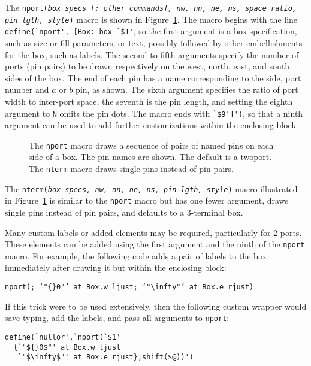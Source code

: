 The {\tt nport({\sl box specs {\tt[;} other commands{\tt]},
  nw, nn, ne, ns, space ratio, pin lgth, style})}
macro is shown in Figure~\ref{Nport}.
The macro begins with the line \verb|define(`nport',`[Box: box `$1'|,
so the first argument is a box specification, such as size or fill parameters,
or text, possibly followed by other embellishments for the box, such as labels.
The second to fifth arguments specify the number of ports
(pin pairs) to be drawn respectively on the west, north, east, and south
sides of the box.  The end of each pin has a name corresponding to the
side, port number and $a$ or $b$ pin, as shown.
The sixth argument
specifies the ratio of port width to inter-port space, the seventh is
the pin length, and setting the eighth argument to {\tt N} omits the pin
dots.
The macro ends with \verb|`$9']')|, so that a ninth argument can be used
to add further customizations within the enclosing block.
\begin{figure}[h!b]
   
   \caption{The {\tt nport} macro draws a sequence of pairs of named pins
     on each side of a box.  The pin names are shown.  The default is a twoport.
     The {\tt nterm} macro draws single pins instead of pin pairs.}
   \label{Nport}
   \end{figure}

The {\tt nterm({\sl box specs, nw, nn, ne, ns, pin lgth, style})} macro
illustrated in Figure~\ref{Nport} is similar to the {\tt nport} macro but
has one fewer argument, draws single pins instead of pin pairs, and
defaults to a 3-terminal box.

Many custom labels or added elements may be required, particularly for
2-ports\label{NPORTS}. These elements can be added using the first
argument and the ninth of the {\tt nport} macro.
For example, the following code adds a pair of labels to the box
immediately after drawing it but within the enclosing block:

{\tt nport(; {`"${}0$"' at Box.w ljust; `"$\infty$"' at Box.e rjust})}

If this trick were to be used extensively, then the following custom wrapper
would save typing, add the labels, and pass all arguments to
{\tt nport}:

\begin{verbatim}
define(`nullor',`nport(`$1'
  {`"${}0$"' at Box.w ljust
   `"$\infty$"' at Box.e rjust},shift($@))')
\end{verbatim}

